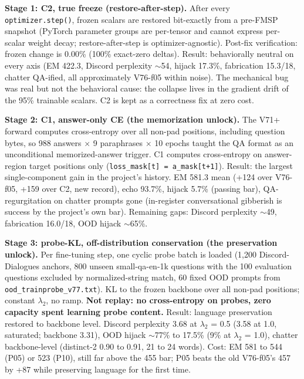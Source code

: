 \documentclass[11pt]{article}
\begin{document}
\textbf{Stage 1: C2, true freeze (restore-after-step).} After every \texttt{optimizer.step()}, frozen scalars are restored bit-exactly from a pre-FMSP snapshot (PyTorch parameter groups are per-tensor and cannot express per-scalar weight decay; restore-after-step is optimizer-agnostic). Post-fix verification: frozen change is 0.00\% (100\% exact-zero deltas). Result: behaviorally neutral on every axis (EM 422.3, Discord perplexity $\sim$54, hijack 17.3\%, fabrication 15.3/18, chatter QA-ified, all approximately V76-f05 within noise). The mechanical bug was real but not the behavioral cause: the collapse lives in the gradient drift of the 95\% trainable scalars. C2 is kept as a correctness fix at zero cost.

\textbf{Stage 2: C1, answer-only CE (the memorization unlock).} The V71+ forward computes cross-entropy over all non-pad positions, including question bytes, so 988 answers $\times$ 9 paraphrases $\times$ 10 epochs taught the QA format as an unconditional memorized-answer trigger. C1 computes cross-entropy on answer-region target positions only (\texttt{loss\_mask[t] = a\_mask[t+1]}). Result: the largest single-component gain in the project's history. EM 581.3 mean (+124 over V76-f05, +159 over C2, new record), echo 93.7\%, hijack 5.7\% (passing bar), QA-regurgitation on chatter prompts gone (in-register conversational gibberish is success by the project's own bar). Remaining gaps: Discord perplexity $\sim$49, fabrication 16.0/18, OOD hijack $\sim$65\%.

\textbf{Stage 3: probe-KL, off-distribution conservation (the preservation unlock).} Per fine-tuning step, one cyclic probe batch is loaded (1{,}200 Discord-Dialogues anchors, 800 unseen small-qa-en-1k questions with the 100 evaluation questions excluded by normalized-string match, 60 fixed OOD prompts from \texttt{ood\_trainprobe\_v77.txt}). KL to the frozen backbone over all non-pad positions; constant $\lambda_2$, no ramp. \textbf{Not replay: no cross-entropy on probes, zero capacity spent learning probe content.} Result: language preservation restored to backbone level. Discord perplexity 3.68 at $\lambda_2$ = 0.5 (3.58 at 1.0, saturated; backbone 3.31), OOD hijack $\sim$77\% to 17.5\% (9\% at $\lambda_2$ = 1.0), chatter backbone-level (distinct-2 0.90 to 0.91, 21 to 24 words). Cost: EM 581 to 544 (P05) or 523 (P10), still far above the 455 bar; P05 beats the old V76-f05's 457 by +87 while preserving language for the first time.
\end{document}

